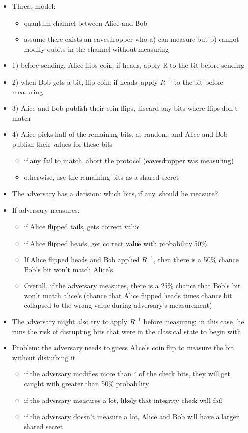 \begin{itemize}
	\item Threat model:
		\begin{itemize}
			\item quantum channel between Alice and Bob
			\item assume there exists an eavesdropper who a) can measure but b) cannot modify qubits in the channel without measuring
		\end{itemize}
	\item 1) before sending, Alice flips coin; if heads, apply R to the bit before sending
	\item 2) when Bob gets a bit, flip coin: if heads, apply $R^{-1}$ to the bit before measuring
	\item 3) Alice and Bob publish their coin flips, discard any bits where flips don't match
	\item 4) Alice picks half of the remaining bits, at random, and Alice and Bob publish their values for these bits
		\begin{itemize}
			\item if any fail to match, abort the protocol (eavesdropper was measuring)
			\item otherwise, use the remaining bits as a shared secret
		\end{itemize}
	\item The adversary has a decision: which bits, if any, should he measure?
	\item If adversary measures:
		\begin{itemize}
			\item if Alice flipped tails, gets correct value
			\item if Alice flipped heads, get correct value with probability 50\%
			\item If Alice flipped heads and Bob applied $R^{-1}$, then there is a 50\% chance Bob's bit won't match Alice's
			\item Overall, if the adversary measures, there is a 25\% chance that Bob's bit won't match alice's (chance that Alice flipped heads times chance bit collapsed to the wrong value during adversary's measurement)
		\end{itemize}
	\item The adversary might also try to apply $R^{-1}$ before measuring; in this case, he runs the risk of disrupting bits that were in the classical state to begin with
	\item Problem: the adversary needs to guess Alice's coin flip to measure the bit without disturbing it
		\begin{itemize}
			\item if the adversary modifies more than 4 of the check bits, they will get caught with greater than 50\% probability
			\item if the adversary measures a lot, likely that integrity check will fail
			\item if the adversary doesn't measure a lot, Alice and Bob will have a larger shared secret		
		\end{itemize}
\end{itemize}
